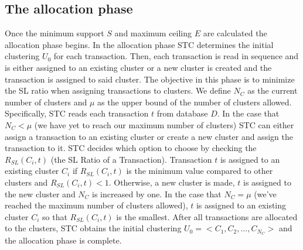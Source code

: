 \documentclass[11pt,reqno]{amsart}
\theoremstyle{definition}
\numberwithin{equation}{subsection}
\begin{document}
\subsection{The allocation phase} Once the minimum support $S$ and maximum ceiling $E$ are calculated the allocation phase begins. In the allocation phase STC determines the initial clustering $U_0$ for each transaction. Then, each transaction is read in sequence and is either assigned to an existing cluster or a new cluster is created and the transaction is assigned to said cluster. The objective in this phase is to minimize the SL ratio when assigning transactions to clusters.  We define $N_C$ as the current number of clusters and $\mu$ as the upper bound of the number of clusters allowed. Specifically, STC reads each transaction $t$ from database $D$. In the case that $N_C < \mu$ (we have yet to reach our maximum number of clusters) STC can either assign a transaction to an existing cluster or create a new cluster and assign the transaction to it. STC decides which option to choose by checking the $R_{SL}(C_i,t)$ (the SL Ratio of a Transaction). Transaction $t$ is assigned to an existing cluster $C_i$ if  $R_{SL}(C_i,t)$ is the minimum value compared to other clusters and $R_{SL}(C_i,t) < 1$. Otherwise, a new cluster is made, $t$ is assigned to the new cluster and $N_C$ is increased by one. In the case that $N_C = \mu$ (we've reached the maximum number of clusters allowed), $t$ is assigned to an existing cluster $C_i$ so that $R_{SL}(C_i,t)$ is the smallest. After all transactions are allocated to the clusters, STC obtains the initial clustering $U_0 =< C_1 , C_2 , ..., C_{N_C} >$ and the allocation phase is complete.
\end{document}
